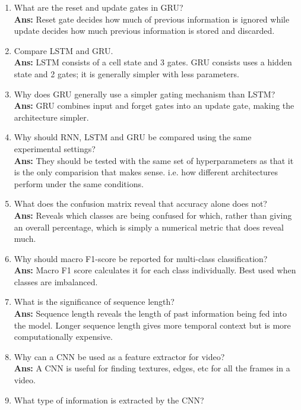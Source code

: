 \documentclass[10pt]{article}
\begin{document}
\begin{enumerate}
\textbf{Ans:} Forget gate decides what information to remove, input gate decides what to store and update gate decides how much previous information is stored and discarded.
\item What are the reset and update gates in GRU?\\
\textbf{Ans:} Reset gate decides how much of previous information is ignored while update decides how much previous information is stored and discarded.
\item Compare LSTM and GRU.\\
\textbf{Ans:} LSTM consists of a cell state and 3 gates. GRU consists uses a hidden state and 2 gates; it is generally simpler with less parameters.
\item Why does GRU generally use a simpler gating mechanism than LSTM?\\
\textbf{Ans:} GRU combines input and forget gates into an update gate, making the architecture simpler.
\item Why should RNN, LSTM and GRU be compared using the same experimental settings?\\
\textbf{Ans:} They should be tested with the same set of hyperparameters as that it is the only comparision that makes sense. i.e. how different architectures perform under the same conditions.
\item What does the confusion matrix reveal that accuracy alone does not?\\
\textbf{Ans:} Reveals which classes are being confused for which, rather than giving an overall percentage, which is simply a numerical metric that does reveal much.
\item Why should macro F1-score be reported for multi-class classification?\\
\textbf{Ans:} Macro F1 score calculates it for each class individually. Best used when classes are imbalanced.
\item What is the significance of sequence length?\\
\textbf{Ans:} Sequence length reveals the length of past information being fed into the model. Longer sequence length gives more temporal context but is more computationally expensive.
\item Why can a CNN be used as a feature extractor for video?\\
\textbf{Ans:} A CNN is useful for finding textures, edges, etc for all the frames in a video.
\item What type of information is extracted by the CNN?\\

\end{enumerate}
\end{document}
